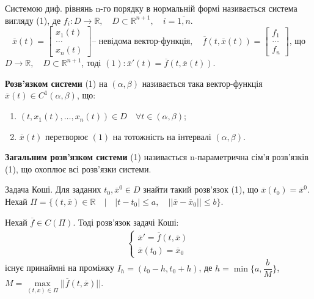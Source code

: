 \documentclass[14pt,a4paper]{scrartcl}
\theoremstyle{definition}
\theoremstyle{definition}
\theoremstyle{definition}
\begin{document}
 Системою диф. рівнянь n-го порядку в нормальній формі називається система вигляду (1), де $ f_i : D \to \mathbb{R}, \quad D \subset \mathbb{R}^{n+1 }, \quad i = \overline{1, n}$.
\look
\[
      \overline{x}(t) = \left[\begin{array}{l}
      x_1(t)    \\
      \dots     \\
      x_n(t)
      \end{array}\right] \text{-- невідома вектор-функція}, \quad
      \overline{f}(t, \overline{x}(t)) = \left[\begin{array}{l}
      f_1     \\
      \dots  \\
      f_n
      \end{array}\right] \text{, що}
\]
$D \rightarrow \mathbb{R}, \quad D \subset \mathbb{R}^{n+1}$, тоді $(1): \overline{x}'(t) = \overline{f}(t, \overline{x}(t))$.


\def\rect{\textbf{П}}
\bd
\textbf{Розв'язком системи} (1) на $(\alpha , \beta)$ називається така вектор-функція $\overline{x} (t) \in C^1(\alpha , \beta)$, що:
\begin{enumerate}
  \item $(t, x_1(t), \dots, x_n(t)) \in D \quad \forall t \in (\alpha, \beta)$;
  \item $\overline{x}(t)$  перетворює $(1)$ на тотожність на інтервалі $(\alpha, \beta)$.
\end{enumerate}

\textbf{Загальним розв'язком системи}  (1) називається n-параметрична сім'я розв'язків (1), що охоплює всі розв'язки системи.
\ed

Задача Коші. Для заданих $t_0, \overline{x}^{0} \in D$ знайти такий розв'язок (1), що $\overline{x} (t_0) = \overline{x}^{0}$.
Нехай $\Pi = \{(t, \overline{x}) \in \mathbb{R} \quad \big| \quad |t-t_0| \leq a, \quad ||\overline{x} - \overline{x}_0|| \leq b \}$.

\begin{boxteo}
Нехай $\overline{f} \in C(\Pi)$. Тоді розв'язок задачі Коші:
\begin{gather*}
  \begin{cases}
    \overline{x}' = \overline{f}(t, \overline{x}) \\
    \overline{x}(t_0) = \overline{x}_0
  \end{cases}
\end{gather*}
існує принаймні на проміжку $I_h = (t_0 - h, t_0 + h)$, де $h = \min\{{a, \dfrac{b}{M}}\}$, \\ $M = \max\limits_{(t, x) \in \Pi} {||\overline{f}(t, \overline{x})||}$.
\end{boxteo}
\end{document}
